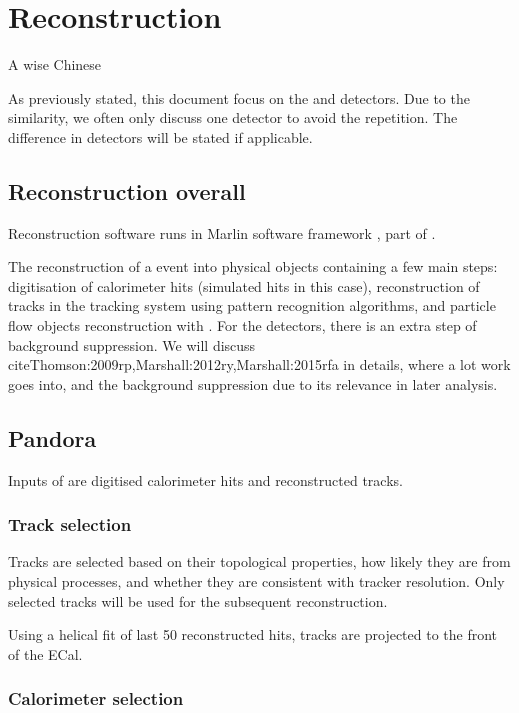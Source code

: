 \chapter{Reconstruction}
\label{chap:Reconstruction}

%
{A wise Chinese}%

As previously stated, this document focus on the \ILD and \CLICILD detectors. Due to the similarity, we often only discuss one detector to avoid the repetition. The difference in detectors will be stated if applicable.

\section{Reconstruction overall}

Reconstruction software runs in Marlin software framework \cite{Gaede:2006pj}, part of \ilcsoft.

The reconstruction of a event into physical objects containing a few main steps: digitisation of calorimeter hits (simulated hits in this case), reconstruction of tracks in the tracking system using pattern recognition algorithms, and particle flow objects reconstruction with \pandora. For the \CLIC detectors, there is an extra step of \ggHad background suppression. We will discuss \pandora cite{Thomson:2009rp,Marshall:2012ry,Marshall:2015rfa} in details, where a lot work goes into, and the background suppression due to its relevance in later analysis.

\section{Pandora}

Inputs of \pandora are digitised calorimeter hits and reconstructed tracks.

\subsection{Track selection}

Tracks are selected based on their topological properties, how likely they are from physical processes, and whether they are consistent with tracker resolution. Only selected tracks will be used for the subsequent reconstruction.

Using a helical fit of last 50 reconstructed hits, tracks are projected to the front of the ECal.

\subsection{Calorimeter selection}

